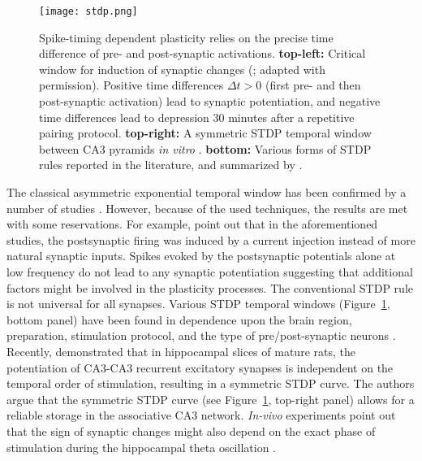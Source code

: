     \begin{figure}
      \center
      \texttt{[image: stdp.png]}
      \caption{
        Spike-timing dependent plasticity relies on the precise time
        difference of pre- and post-synaptic activations. {\bf top-left:}
        Critical window for induction of synaptic changes (\citealp{Bi1998}; adapted with permission).
        Positive time differences $\Delta t >0$ (first pre- and
        then post-synaptic activation) lead to synaptic potentiation, and
        negative time differences lead to depression 30 minutes after a
        repetitive pairing protocol. {\bf top-right:} A symmetric STDP temporal
        window between CA3 pyramids {\it in vitro} \citep{Mishra2016}. {\bf
        bottom:} Various forms of STDP rules reported in the literature, and
        summarized by \cite{Feldman2012}.
             }
    \label{fig:stdp}
    \end{figure}

    The classical asymmetric exponential temporal window has been confirmed by
    a number of studies \citep[e.g.,][]{Debanne1998, Zhang1998}. However,
    because of the used techniques, the results are met with some reservations.
    For example, \cite{Lisman2005} point out that in the aforementioned
    studies, the postsynaptic firing was induced by a current injection instead
    of more natural synaptic inputs. Spikes evoked by the postsynaptic
    potentials alone at low frequency do not lead to any synaptic potentiation
    \citep{Wittenberg2006} suggesting that additional factors might be involved
    in the plasticity processes. The conventional STDP rule
    \citep[i.e.,][]{Bi1998, Kempter1999} is not universal for all synapses.
    Various STDP temporal windows (Figure~\ref{fig:stdp}, bottom panel) have
    been found in dependence upon the brain region, preparation, stimulation
    protocol, and the type of pre/post-synaptic neurons \citep{Feldman2012,
    Vogels2013}. Recently, \cite{Mishra2016} demonstrated that in hippocampal
    slices of mature rats, the potentiation of CA3-CA3 recurrent excitatory
    synapses is independent on the temporal order of stimulation, resulting in
    a symmetric STDP curve. The authors argue that the symmetric STDP curve
    (see Figure~\ref{fig:stdp}, top-right panel) allows for a reliable storage
    in the associative CA3 network. {\it In-vivo} experiments point out that
    the sign of synaptic changes might also depend on the exact phase of
    stimulation during the hippocampal theta oscillation \citep{Hoelscher1997}.

